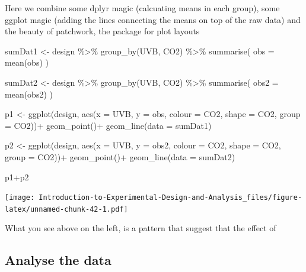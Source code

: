 \documentclass[
]{book}
\newenvironment{Shaded}{\begin{snugshade}}{\end{snugshade}}
\newcommand{\AttributeTok}[1]{\textcolor[rgb]{0.77,0.63,0.00}{#1}}
\newcommand{\FunctionTok}[1]{\textcolor[rgb]{0.00,0.00,0.00}{#1}}
\newcommand{\NormalTok}[1]{#1}
\newcommand{\OtherTok}[1]{\textcolor[rgb]{0.56,0.35,0.01}{#1}}
\newcommand{\SpecialCharTok}[1]{\textcolor[rgb]{0.00,0.00,0.00}{#1}}
\begin{document}
Here we combine some dplyr magic (calcuating means in each group), some ggplot magic (adding the lines connecting the means on top of the raw data) and the beauty of patchwork, the package for plot layouts

\begin{Shaded}
\begin{Highlighting}[]
\NormalTok{sumDat1 }\OtherTok{\textless{}{-}}\NormalTok{ design }\SpecialCharTok{\%\textgreater{}\%} 
  \FunctionTok{group\_by}\NormalTok{(UVB, CO2) }\SpecialCharTok{\%\textgreater{}\%} 
  \FunctionTok{summarise}\NormalTok{(}
    \AttributeTok{obs =} \FunctionTok{mean}\NormalTok{(obs)}
\NormalTok{  )}

\NormalTok{sumDat2 }\OtherTok{\textless{}{-}}\NormalTok{ design }\SpecialCharTok{\%\textgreater{}\%} 
  \FunctionTok{group\_by}\NormalTok{(UVB, CO2) }\SpecialCharTok{\%\textgreater{}\%} 
  \FunctionTok{summarise}\NormalTok{(}
    \AttributeTok{obs2 =} \FunctionTok{mean}\NormalTok{(obs2)}
\NormalTok{  )}

\NormalTok{p1 }\OtherTok{\textless{}{-}} \FunctionTok{ggplot}\NormalTok{(design, }\FunctionTok{aes}\NormalTok{(}\AttributeTok{x =}\NormalTok{ UVB, }\AttributeTok{y =}\NormalTok{ obs, }\AttributeTok{colour =}\NormalTok{ CO2, }\AttributeTok{shape =}\NormalTok{ CO2, }\AttributeTok{group =}\NormalTok{ CO2))}\SpecialCharTok{+}
  \FunctionTok{geom\_point}\NormalTok{()}\SpecialCharTok{+}
  \FunctionTok{geom\_line}\NormalTok{(}\AttributeTok{data =}\NormalTok{ sumDat1)}

\NormalTok{p2 }\OtherTok{\textless{}{-}} \FunctionTok{ggplot}\NormalTok{(design, }\FunctionTok{aes}\NormalTok{(}\AttributeTok{x =}\NormalTok{ UVB, }\AttributeTok{y =}\NormalTok{ obs2, }\AttributeTok{colour =}\NormalTok{ CO2, }\AttributeTok{shape =}\NormalTok{ CO2, }\AttributeTok{group =}\NormalTok{ CO2))}\SpecialCharTok{+}
  \FunctionTok{geom\_point}\NormalTok{()}\SpecialCharTok{+}
  \FunctionTok{geom\_line}\NormalTok{(}\AttributeTok{data =}\NormalTok{ sumDat2)}

\NormalTok{p1}\SpecialCharTok{+}\NormalTok{p2}
\end{Highlighting}
\end{Shaded}

\texttt{[image: Introduction-to-Experimental-Design-and-Analysis\_files/figure-latex/unnamed-chunk-42-1.pdf]}

What you see above on the left, is a pattern that suggest that the effect of

\hypertarget{analyse-the-data}{%
\subsection{Analyse the data}\label{analyse-the-data}}
\end{document}
